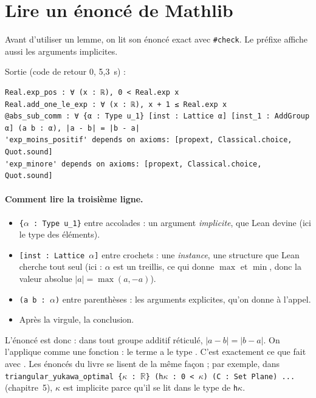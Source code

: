 \section{Lire un énoncé de Mathlib}\label{appC:sec:lire}

Avant d'utiliser un lemme, on lit son énoncé exact avec \texttt{\#check}. Le préfixe  affiche aussi les arguments
implicites.

\noindent Sortie (code de retour $0$, 5,3~s) :
\begin{lstlisting}[style=appC,language={}]
Real.exp_pos : ∀ (x : ℝ), 0 < Real.exp x
Real.add_one_le_exp : ∀ (x : ℝ), x + 1 ≤ Real.exp x
@abs_sub_comm : ∀ {α : Type u_1} [inst : Lattice α] [inst_1 : AddGroup α] (a b : α), |a - b| = |b - a|
'exp_moins_positif' depends on axioms: [propext, Classical.choice, Quot.sound]
'exp_minore' depends on axioms: [propext, Classical.choice, Quot.sound]
\end{lstlisting}

\paragraph{Comment lire la troisième ligne.}
\begin{itemize}
\item \texttt{\{$\alpha$ : Type u\_1\}} entre accolades : un argument \emph{implicite}, que Lean devine (ici le type des éléments).
\item \texttt{[inst : Lattice $\alpha$]} entre crochets : une \emph{instance}, une structure que Lean cherche tout seul
(ici : $\alpha$ est un treillis, ce qui donne $\max$ et $\min$, donc la valeur absolue $|a|=\max(a,-a)$).
\item \texttt{(a b : $\alpha$)} entre parenthèses : les arguments explicites, qu'on donne à l'appel.
\item Après la virgule, la conclusion.
\end{itemize}
L'énoncé est donc : dans tout groupe additif réticulé, $|a-b|=|b-a|$. On l'applique comme une fonction : le terme
 a le type . C'est exactement ce que fait  avec
. Les énoncés du livre se lisent de la même façon ; par exemple, dans
\texttt{triangular\_yukawa\_optimal \{$\kappa$ : $\mathbb R$\} (h$\kappa$ : 0 < $\kappa$) (C : Set Plane) ...} (chapitre~5), \texttt{$\kappa$} est implicite parce
qu'il se lit dans le type de \texttt{h$\kappa$}.

